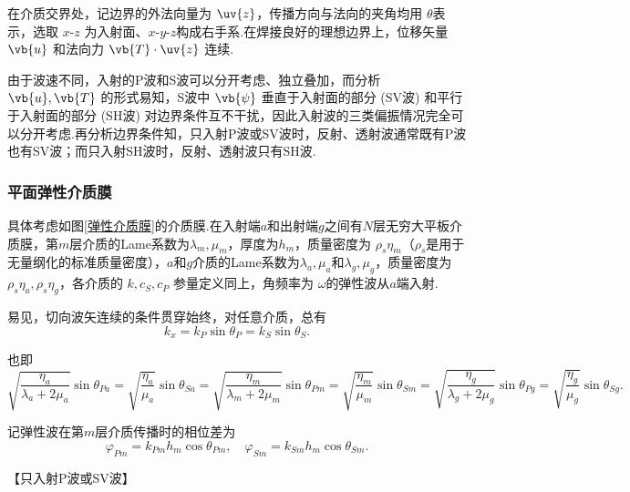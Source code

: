 在介质交界处，记边界的外法向量为 \(\uv{z}\)，传播方向与法向的夹角均用 \(\theta\)表示，选取 \(x\text{-}z\) 为入射面、\(x\text{-}y\text{-}z\)构成右手系.在焊接良好的理想边界上，位移矢量 \(\vb{u}\) 和法向力 \(\vb{T} \cdot \uv{z}\) 连续.

由于波速不同，入射的P波和S波可以分开考虑、独立叠加，而分析 \(\vb{u}, \vb{T}\) 的形式易知，S波中 \(\vb{\psi}\) 垂直于入射面的部分 (SV波) 和平行于入射面的部分 (SH波) 对边界条件互不干扰，因此入射波的三类偏振情况完全可以分开考虑.再分析边界条件知，只入射P波或SV波时，反射、透射波通常既有P波也有SV波；而只入射SH波时，反射、透射波只有SH波.

\subsubsection{平面弹性介质膜}

具体考虑如图\ref{弹性介质膜}的介质膜.在入射端\(a\)和出射端\(g\)之间有\(N\)层无穷大平板介质膜，第\(m\)层介质的Lame系数为\(\lambda_m, \mu_m\)，厚度为\(h_m\)，质量密度为 \(\rho_s \eta_m\)（\(\rho_s\)是用于无量纲化的标准质量密度），\(a\)和\(g\)介质的Lame系数为\(\lambda_a, \mu_a\)和\(\lambda_g, \mu_g\)，质量密度为 \(\rho_s \eta_a, \rho_s \eta_g\)，各介质的 \(k, c_S, c_P\) 参量定义同上，角频率为 \(\omega\)的弹性波从\(a\)端入射.

易见，切向波矢连续的条件贯穿始终，对任意介质，总有
\begin{equation*}
	k_x = k_P \sin\theta_P = k_S \sin\theta_S.
\end{equation*}

也即
\begin{equation*}
	\sqrt{\dfrac{\eta_a}{\lambda_a + 2\mu_a}} \sin\theta_{Pa} = \sqrt{\dfrac{\eta_a}{\mu_a}} \sin\theta_{Sa} = \sqrt{\dfrac{\eta_m}{\lambda_m + 2\mu_m}} \sin\theta_{Pm} = \sqrt{\dfrac{\eta_m}{\mu_m}} \sin\theta_{Sm} = \sqrt{\dfrac{\eta_g}{\lambda_g + 2\mu_g}} \sin\theta_{Pg} = \sqrt{\dfrac{\eta_g}{\mu_g}} \sin\theta_{Sg}.
\end{equation*}

记弹性波在第\(m\)层介质传播时的相位差为
\begin{equation*}
	\varphi_{Pm} = k_{Pm} h_m \cos\theta_{Pm}, \quad \varphi_{Sm} = k_{Sm} h_m \cos\theta_{Sm}.
\end{equation*}

【只入射P波或SV波】

